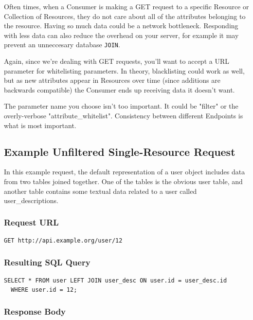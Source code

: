 \documentclass{book}
\begin{document}
Often times, when a Consumer is making a GET request to a specific Resource or Collection of Resources, they do not care about all of the attributes belonging to the resource. Having so much data could be a network bottleneck. Responding with less data can also reduce the overhead on your server, for example it may prevent an unneccesary database \texttt{JOIN}.

Again, since we're dealing with GET requests, you'll want to accept a URL parameter for whitelisting parameters. In theory, blacklisting could work as well, but as new attributes appear in Resources over time (since additions are backwards compatible) the Consumer ends up receiving data it doesn't want.

The parameter name you choose isn't too important. It could be "filter" or the overly-verbose "attribute\_whitelist". Consistency between different Endpoints is what is most important.

\subsection{Example Unfiltered Single-Resource Request}

In this example request, the default representation of a user object includes data from two tables joined together. One of the tables is the obvious user table, and another table contains some textual data related to a user called user\_descriptions.

\subsubsection{Request URL}

\begin{verbatim}
GET http://api.example.org/user/12
\end{verbatim}

\subsubsection{Resulting SQL Query}

\begin{verbatim}
SELECT * FROM user LEFT JOIN user_desc ON user.id = user_desc.id
  WHERE user.id = 12;
\end{verbatim}

\subsubsection{Response Body}
\end{document}
